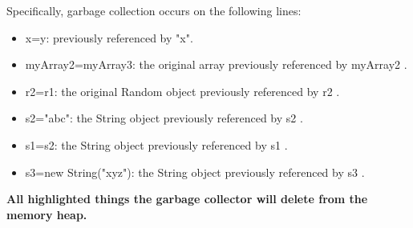 \documentclass{assignment}
\begin{document}
Specifically, garbage collection occurs on the following lines:
\begin{itemize}
    \item x=y: previously referenced by "x".

    \item myArray2=myArray3: the original array previously referenced by myArray2 .

    \item r2=r1: the original Random object  previously referenced by r2 .

    \item s2="abc": the String object previously referenced by s2 .

    \item s1=s2: the String object previously referenced by s1  .

    \item s3=new String("xyz"): the String object previously referenced by s3 .
\end{itemize}


\textbf{All highlighted things the garbage collector will delete from the memory heap.}






\newpage
\end{document}
